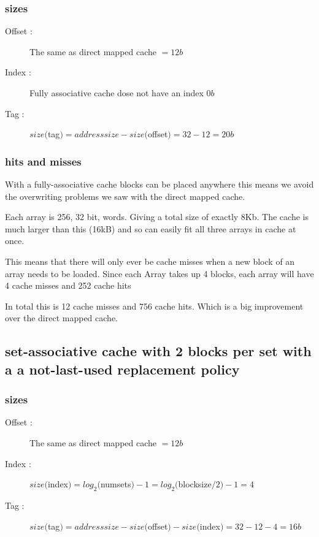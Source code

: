 \documentclass[12pt]{article}
\begin{document}
			\subsubsection{sizes}
				\begin{description}
					\item[Offset : ] The same as direct mapped cache $ = 12 b$
					\item[Index : ] Fully associative cache dose not have an index $0b$
					\item[Tag : ] $size($tag$) = addresssize- size($offset$) = 32 - 12 = 20b$
				\end{description}

			\subsubsection{hits and misses}
				With a fully-associative cache blocks can be placed anywhere this means we avoid the overwriting problems we saw with the direct mapped cache. 

				Each array is 256, 32 bit, words. Giving a total size of exactly 8Kb. The cache is much larger than this (16kB) and so can easily fit all three arrays in cache at once.

				This means that there will only ever be cache misses when a new block of an array needs to be loaded. Since each Array takes up 4 blocks, each array will have 4 cache misses and 252 cache hits 

				In total this is 12 cache misses and 756 cache hits. Which is a big improvement over the direct mapped cache.

		\subsection{set-associative cache with 2 blocks per set with a a not-last-used replacement policy}

			\subsubsection{sizes}
			
				\begin{description}
					\item[Offset : ] The same as direct mapped cache $ = 12 b$
					\item[Index : ] $size($index$) = log_2($numsets$) -1 = log_2($blocksize$/2) -1 = 4$
					\item[Tag : ] $size($tag$) = addresssize- size($offset$) - size($index$) = 32 - 12 -4 = 16b$
				\end{description}
\end{document}
